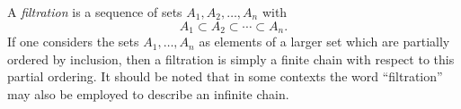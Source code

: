\documentclass{article}
\begin{document}
A {\em filtration} is a sequence of sets $A_1, A_2, \dots, A_n$ with
$$
A_1 \subset A_2 \subset \cdots \subset A_n.
$$
If one considers the sets $A_1, \dots, A_n$ as elements of a larger set which are partially ordered by inclusion, then a filtration is simply a finite chain with respect to this partial ordering. It should be noted that in some contexts the word ``filtration'' may also be employed to describe an infinite chain.
\end{document}
